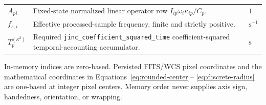 \begin{longtable}{@{}>{\raggedright\arraybackslash}p{}
                        >{\raggedright\arraybackslash}p{}
                        >{\raggedright\arraybackslash}p{}@{}}
$A_{pi}$ & Fixed-state normalized linear operator row
$I_{ip}\omega_i\kappa_{ip}/C_p$. & $1$ \\
$f_{s,i}$ & Effective processed-sample frequency, finite and strictly
positive. & $\mathrm{s}^{-1}$ \\
$T_p^{(\kappa^2)}$ & Required
\texttt{jinc\_coefficient\_squared\_time} coefficient-squared
temporal-accounting accumulator. & $\mathrm{s}$ \\
\bottomrule
\end{longtable}

In-memory indices are zero-based.  Persisted FITS/WCS pixel coordinates and
the mathematical coordinates in Equations~\eqref{eq:rounded-center}--
\eqref{eq:discrete-radius} are one-based at integer pixel centers.  Memory
order never supplies axis sign, handedness, orientation, or wrapping.
